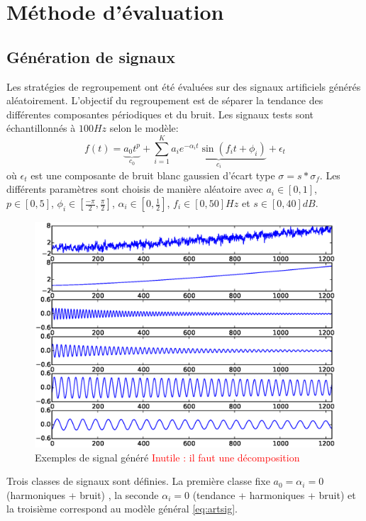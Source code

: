 \documentclass{gretsi}
\newcommand{\inter}{\left[0, 1\right]}
\begin{document}

\section{Méthode d'évaluation}
\label{sec:eval}

\subsection{Génération de signaux}
\label{sub:artsig}

    Les stratégies de regroupement ont été évaluées sur des signaux artificiels générés aléatoirement.
    L'objectif du regroupement est de séparer la tendance des différentes composantes périodiques et du bruit. Les signaux tests sont échantillonnés à $100Hz$ selon le modèle:
    \begin{equation}\label{eq:artsig}
    f(t) = \underbrace{a_0 t^p}_{c_0} + \sum_{i=1}^K \underbrace{a_i e^{-\alpha_i t} \sin\left(f_i t + \phi_i\right)}_{c_i} + \epsilon_t
    \end{equation}
    où $\epsilon_t$  est une composante de bruit blanc gaussien d'écart type $\sigma = s*\sigma_f$.
    Les différents paramètres sont choisis de manière aléatoire avec $a_i \in \inter$, $p \in \left[0, 5\right]$, $\displaystyle \phi_i \in\left[\frac{-\pi}{2}, \frac{\pi}{2}\right]$, $\alpha_i \in \left[0, \frac{1}{2}\right]$, $f_i \in \left[0, 50\right]Hz$ et $s \in \left[0, 40\right]dB$.
    
    \begin{figure}[htp]
        \centering
        \includegraphics[width=.5\textwidth]{img/artsig2.eps}
        \vspace{-.7cm}\caption{Exemples de signal généré \textcolor{red}{Inutile : il faut une décomposition}}
        \label{}
    \end{figure}

    Trois classes de signaux sont définies.
    La première classe fixe $a_0 = \alpha_i = 0$ (harmoniques + bruit) , la seconde $\alpha_i = 0$ (tendance + harmoniques + bruit) et la troisième correspond au modèle général \eqref{eq:artsig}.
\end{document}
